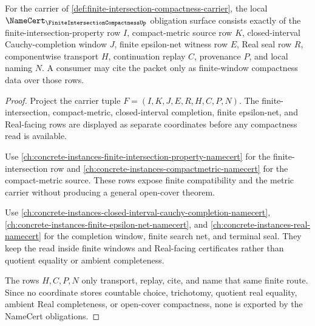 \begin{theorem}
\label{thm:finite-intersection-compactness-namecert-obligations}
For the carrier of \autoref{def:finite-intersection-compactness-carrier}, the local $\NameCert_{\FiniteIntersectionCompactnessUp}$ obligation surface consists exactly of the finite-intersection-property row $I$, compact-metric source row $K$, closed-interval Cauchy-completion window $J$, finite epsilon-net witness row $E$, Real seal row $R$, componentwise transport $H$, continuation replay $C$, provenance $P$, and local naming $N$. A consumer may cite the packet only as finite-window compactness data over those rows.
\end{theorem}
\begin{proof}
Project the carrier tuple $F=(I,K,J,E,R,H,C,P,N)$. The finite-intersection, compact-metric, closed-interval completion, finite epsilon-net, and Real-facing rows are displayed as separate coordinates before any compactness read is available.

Use \autoref{ch:concrete-instances-finite-intersection-property-namecert} for the finite-intersection row and \autoref{ch:concrete-instances-compactmetric-namecert} for the compact-metric source. These rows expose finite compatibility and the metric carrier without producing a general open-cover theorem.

Use \autoref{ch:concrete-instances-closed-interval-cauchy-completion-namecert}, \autoref{ch:concrete-instances-finite-epsilon-net-namecert}, and \autoref{ch:concrete-instances-real-namecert} for the completion window, finite search net, and terminal seal. They keep the read inside finite windows and Real-facing certificates rather than quotient equality or ambient completeness.

The rows $H,C,P,N$ only transport, replay, cite, and name that same finite route. Since no coordinate stores countable choice, trichotomy, quotient real equality, ambient Real completeness, or open-cover compactness, none is exported by the NameCert obligations.
\end{proof}


